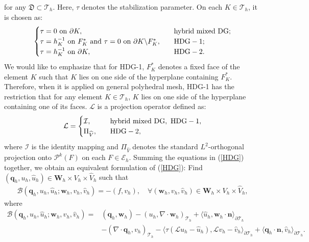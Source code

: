 \documentclass[1996/10/24]{amsart}
\theoremstyle{definition}
\numberwithin{equation}{section}
\begin{document}
for any $\mathfrak{D}\subset\mathcal{T}_h$. Here, $\tau$ denotes the stabilization parameter. On each $K\in\mathcal{T}_h$, it is chosen as:
\begin{align}
\label{HDG_stabs}
\begin{cases}
\tau=0~{\rm on}~\partial K,\quad & {\rm hybrid~mixed~DG};\\
\tau=h_K^{-1}~{\rm on}~F^{\ast}_K~{\rm and}~\tau=0~{\rm on}~\partial K\backslash F_K^{\ast},\quad & {\rm HDG-1};\\
\tau= h_K^{-1}~{\rm on}~\partial K,\quad &{\rm HDG-2}.
\end{cases}
\end{align}
We would like to emphasize that for HDG-1, $F_{K}^{\ast}$ denotes a fixed face of the element $K$
such that $K$ lies on one side of the hyperplane containing $F_{K}^{\ast}$. Therefore, when it is applied
on  general polyhedral mesh, HDG-1 has the restriction that for any element $K\in \mathcal{T}_{h}$, $K$ lies
on one side of the hyperplane containing one of its faces.
$\mathcal{L}$ is a projection operator defined as:
\begin{align*}
\mathcal{L}=\begin{cases}
\mathcal{I},\quad & {\rm hybrid~mixed~DG},~{\rm HDG-1},\\
\Pi_{\widehat{V}},\quad &{\rm HDG-2},
\end{cases}
\end{align*}
where $\mathcal{I}$ is the identity mapping and $\Pi_{\widehat{V}}$ denotes the standard $L^2$-orthogonal projection onto $\mathcal{P}^k(F)$ on each
$F\in\mathcal{E}_h$. Summing the equations in (\ref{HDG}) together, we obtain an equivalent formulation of (\ref{HDG}): Find $({\bm q}_h,u_h,\widehat{u}_h)\in {\bm W}_h\times V_h\times \widehat{V}_h$ such that
\begin{align}
\mathcal{B}({\bm q}_h,u_h,\widehat{u}_h;{\bm w}_h,v_h,\widehat{v}_h)=-(f,v_h),\quad \forall ({\bm w}_h,v_h,\widehat{v}_h)\in {\bm W}_h\times V_h\times \widehat{V}_h,\label{eHDG}
\end{align}
where
\begin{align*}
\mathcal{B}({\bm q}_h,u_h,\widehat{u}_h;{\bm w}_h,v_h,\widehat{v}_h)=&({\bm q}_h,{\bm w}_h)-(u_h,\nabla\cdot{\bm w}_h)_{\mathcal{T}_h}
+\langle\widehat{u}_h,{\bm w}_h\cdot{\bm n}\rangle_{\partial\mathcal{T}_h}\\
&-(\nabla\cdot{\bm q}_h,v_h)_{\mathcal{T}_h}-\langle\tau(\mathcal{L}u_h-\widehat{u}_h),\mathcal{L}v_h-\widehat{v}_h\rangle_{\partial \mathcal{T}_h}
+\langle{\bm q}_h\cdot{\bm n},\widehat{v}_h\rangle_{\partial\mathcal{T}_h}.
\end{align*}
\end{document}
